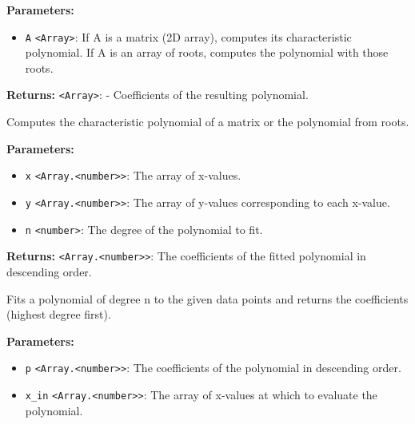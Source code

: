 \documentclass[12pt,a4paper]{article}
\begin{document}
\noindent \textbf{Parameters:}
\begin{itemize}
  \item \texttt{A} \texttt{<Array>}: If \textasciigrave{}A\textasciigrave{} is a matrix (2D array), computes its characteristic polynomial.
                   If \textasciigrave{}A\textasciigrave{} is an array of roots, computes the polynomial with those roots.
\end{itemize}

\noindent \textbf{Returns:} \texttt{<Array>}: - Coefficients of the resulting polynomial.

\noindent Computes the characteristic polynomial of a matrix or the polynomial from roots.

\vspace{5mm}
\noindent {}


\noindent \textbf{Parameters:}
\begin{itemize}
  \item \texttt{x} \texttt{<Array.<number>>}: The array of x-values.
  \item \texttt{y} \texttt{<Array.<number>>}: The array of y-values corresponding to each x-value.
  \item \texttt{n} \texttt{<number>}: The degree of the polynomial to fit.
\end{itemize}

\noindent \textbf{Returns:} \texttt{<Array.<number>>}: The coefficients of the fitted polynomial in descending order.

\noindent Fits a polynomial of degree n to the given data points and returns the coefficients (highest degree first).

\vspace{5mm}
\noindent {}


\noindent \textbf{Parameters:}
\begin{itemize}
  \item \texttt{p} \texttt{<Array.<number>>}: The coefficients of the polynomial in descending order.
  \item \texttt{x\_in} \texttt{<Array.<number>>}: The array of x-values at which to evaluate the polynomial.
\end{itemize}
\end{document}
